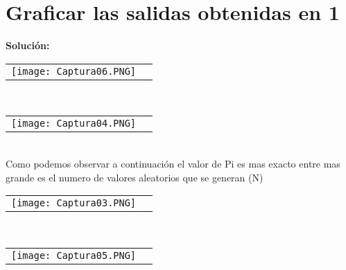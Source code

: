 \documentclass[10pt]{article}\usepackage[]{graphicx}\usepackage[]{color}
\begin{document}
\section{Graficar las salidas obtenidas en 1}
\textbf{Solución:}\\
\begin{tabular}{p{} p{} }
\texttt{[image: Captura06.PNG]}
\end{tabular}\\
\begin{tabular}{p{} p{} }
\texttt{[image: Captura04.PNG]}
\end{tabular}\\
Como podemos observar a continuación el valor de Pi es mas exacto entre mas grande es el numero de valores aleatorios que se generan (N)\\
\begin{tabular}{p{} p{} }
\texttt{[image: Captura03.PNG]}
\end{tabular}\\
\begin{tabular}{p{} p{} }
\texttt{[image: Captura05.PNG]}
\end{tabular}\\
\end{document}
